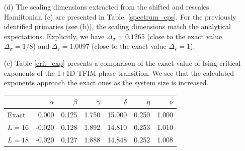 \documentclass[10pt, a4paper]{article}
\begin{document}
{\begin{enumerate}
  \item[(d)] The scaling dimensions extracted from the shifted and rescales Hamiltonian (c) are presented in Table. \ref{spectrum_eps}. For the previously identified primaries (see (b)), the scaling dimensions match the analytical expectations. Explicitly, we have $\Delta_{\sigma} = 0.1265$ (close to the exact value $\Delta_{\sigma} = 1/8$) and $\Delta_{\varepsilon} = 1.0097$ (close to the exact value $\Delta_{\varepsilon} = 1$). 
  \newpage
  \item[(e)] Table \ref{crit_exp} presents a comparison of the exact value of Ising critical exponents \cite{crit_exp} of the 1+1D TFIM phase transition. We see that the calculated exponents approach the exact ones as the system size is increased. 
  \begin{table}
    \centering
    \begin{tabular}{lrrrrrr}
      \toprule
       & $\alpha$ & $\beta$ & $\gamma$ & $\delta$ & $\eta$ & $\nu$ \\
      \midrule
      Exact & 0.000 & 0.125 & 1.750 & 15.000 & 0.250 & 1.000 \\
      $L=16$ & -0.020 & 0.128 & 1.892 & 14.810 & 0.253 & 1.010 \\
      $L=18$ & -0.020 & 0.127 & 1.888 & 14.848 & 0.252 & 1.008 \\
      \bottomrule
      \end{tabular}


\end{table}
\end{enumerate}}
\end{document}

